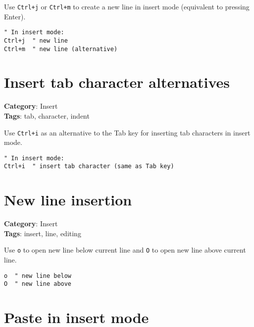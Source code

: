 {{{{{Use {\footnotesize \Verb§Ctrl+j§} or {\footnotesize \Verb§Ctrl+m§} to create a new line in insert mode (equivalent to pressing Enter).

\begin{Exa*}{}
\begin{Verbatim}[fontsize=\footnotesize, breaklines, breakanywhere]
" In insert mode:
Ctrl+j  " new line
Ctrl+m  " new line (alternative)
\end{Verbatim}
\end{Exa*}

\section{Insert tab character alternatives}

\textbf{Category}: Insert\\ \textbf{Tags}: tab, character, indent
\vspace{0.5cm}

Use {\footnotesize \Verb§Ctrl+i§} as an alternative to the Tab key for inserting tab characters in insert mode.

\begin{Exa*}{}
\begin{Verbatim}[fontsize=\footnotesize, breaklines, breakanywhere]
" In insert mode:
Ctrl+i  " insert tab character (same as Tab key)
\end{Verbatim}
\end{Exa*}

\section{New line insertion}

\textbf{Category}: Insert\\ \textbf{Tags}: insert, line, editing
\vspace{0.5cm}

Use {\footnotesize \Verb§o§} to open new line below current line and {\footnotesize \Verb§O§} to open new line above current line.

\begin{Exa*}{}
\begin{Verbatim}[fontsize=\footnotesize, breaklines, breakanywhere]
o  " new line below
O  " new line above
\end{Verbatim}
\end{Exa*}

\section{Paste in insert mode}

}}}}}
